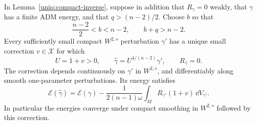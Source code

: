 \begin{lemma}
\label{uniq:correction-mass}
In Lemma~\ref{uniq:compact-inverse}, suppose in addition that
$R_\gamma=0$ weakly, that $\gamma$ has a finite ADM energy,
and that $q>(n-2)/2$. Choose $b$ so that
\begin{equation}\label{uniq:mass-exponents}
 \frac{n-2}{2}<b<n-2,\qquad b+q>n-2.
\end{equation}
Every sufficiently small compact $W^{2,s}$ perturbation $\gamma'$
has a unique small correction $v\in\mathcal X$ for which
\[
 U=1+v>0,\qquad
 \widehat\gamma=U^{4/(n-2)}\gamma',\qquad
 R_{\widehat\gamma}=0.
\]
The correction depends continuously on $\gamma'$ in $W^{2,s}$,
and differentiably along smooth one-parameter perturbations. Its
energy satisfies
\begin{equation}\label{uniq:mass-formula}
 \mathcal E(\widehat\gamma)
 =\mathcal E(\gamma)
  -\frac{1}{2(n-1)\omega}
      \int_M R_{\gamma'}(1+v)\,\dd V_{\gamma'}.
\end{equation}
In particular the energies converge under compact smoothing in
$W^{2,s}$ followed by this correction.
\end{lemma}

